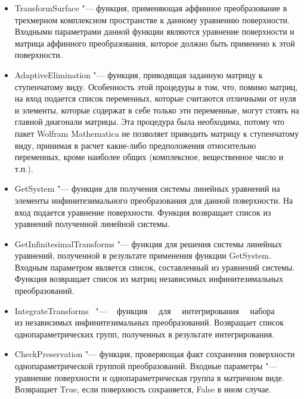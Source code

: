 \documentclass[../main.tex]{subfiles}
\begin{document}
\begin{itemize}

\item {\ttfamily TransformSurface} "--- функция, применяющая аффинное преобразование в трехмерном комплексном пространстве к данному уравнению поверхности. Входными параметрами данной функции являются уравнение поверхности и матрица аффинного преобразования, которое должно быть применено к этой поверхности.

\item {\ttfamily AdaptiveElimination} "--- функция, приводящая заданную матрицу к ступенчатому виду. Особенность этой процедуры в том, что, помимо матриц, на вход подается список переменных, которые считаются отличными от нуля и элементы, которые содержат в себе только эти переменные, могут стоять на главной диагонали матрицы. Эта процедура была необходима, потому что пакет {\ttfamily Wolfram Mathematica} не позволяет приводить матрицу к ступенчатому виду, принимая в расчет какие-либо предположения относительно переменных, кроме наиболее общих (комплексное, вещественное число и т.п.).

\item {\ttfamily GetSystem} "---  функция для получения системы линейных уравнений на элементы инфинитезимального преобразования для данной поверхности. На вход подается уравнение поверхности. Функция возвращает список из уравнений полученной линейной системы.

\item {\ttfamily GetInfinitesimalTransforms} "--- функция для решения системы линейных уравнений, полученной в результате применения функции {\ttfamily GetSystem}. Входным параметром является список, составленный из уравнений системы. Функция возвращает список из матриц независимых инфинитезимальных преобразований.

\item {\ttfamily IntegrateTransforms}~ "--- ~ функция~~ для ~~интегрирования ~~набора\\ из независимых инфинитезимальных преобразований. Возвращает список однопараметрических групп, полученных в результате интегрирования.

\item {\ttfamily CheckPreservation} "--- функция, проверяющая факт сохранения поверхности однопараметрической группой преобразований. Входные параметры "--- уравнение поверхности и однопараметрическая группа в матричном виде. Возвращает {\ttfamily True}, если поверхность сохраняется, {\ttfamily False} в ином случае.

\end{itemize}
\end{document}
